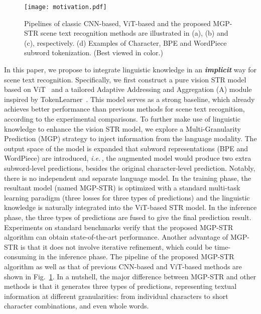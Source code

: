 \documentclass[runningheads]{llncs}
\def\ie{\emph{i.e.}\,}
\begin{document}
\begin{figure}[!htp]\centering
\vspace{-2mm}
 \texttt{[image: motivation.pdf]}
\vspace{-2mm}
 \caption{Pipelines of classic CNN-based, ViT-based and the proposed MGP-STR scene text recognition methods are illustrated in (a), (b) and (c), respectively. (d) Examples of Character, BPE and WordPiece subword tokenization. (Best viewed in color.) }
 \label{fig:motivation}
\vspace{-2mm}
\end{figure}
In this paper, we propose to integrate linguistic knowledge in an \textbf{\textit{implicit}} way for scene text recognition. Specifically, we first construct a pure vision STR model based on ViT~\cite{dosovitskiy2020image} and a tailored Adaptive Addressing and Aggregation (A) module inspired by TokenLearner~\cite{tokenlearner}. This model serves as a strong baseline, which already achieves better performance than previous methods for scene text recognition, according to the experimental comparisons. To further make use of linguistic knowledge to enhance the vision STR model, we explore a Multi-Granularity Prediction (MGP) strategy to inject information from the language modality. The output space of the model is expanded that subword representations (BPE and WordPiece) are introduced, \ie, the augmented model would produce two extra subword-level predictions, besides the original character-level prediction. Notably, there is no independent and separate language model. In the training phase, the resultant model (named MGP-STR) is optimized 
with a standard multi-task learning paradigm (three losses for three types of predictions) and the linguistic knowledge is naturally integrated into the ViT-based STR model. In the inference phase, the three types of predictions are fused to give the final prediction result. Experiments on standard benchmarks verify that the proposed MGP-STR algorithm can obtain state-of-the-art performance. Another advantage of MGP-STR is that it does not involve iterative refinement, which could be time-consuming in the inference phase. The pipeline of the proposed MGP-STR algorithm as well as that of previous CNN-based and ViT-based methods are shown in Fig.~\ref{fig:motivation}. In a nutshell, the major difference between MGP-STR and other methods is that it generates three types of predictions, representing textual information at different granularities: from individual characters to short character combinations, and even whole words. 
\end{document}
